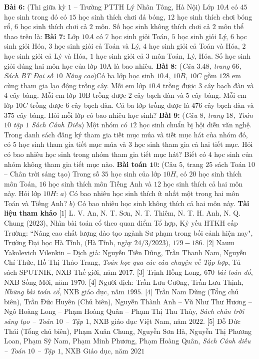 \begin{multicols}{2}
	\textbf{\color{toancuabi}Bài $\pmb6$:} (Thi giữa kỳ $1$ -- Trường PTTH Lý Nhân Tông, Hà Nội) Lớp $10A$ có $45$ học sinh trong đó có $15$ học sinh thích chơi đá bóng, $12$ học sinh thích chơi bóng rổ, $6$ học sinh thích chơi cả $2$ môn. Số học sinh không thích chơi cả $2$ môn thể thao trên là:
	\vskip 0.1cm
	\textbf{\color{toancuabi}Bài $\pmb7$:} Lớp $10A$ có $7$ học sinh giỏi Toán, $5$ học sinh giỏi Lý, $6$ học sinh giỏi Hóa, $3$ học sinh giỏi cả Toán và Lý, $4$ học sinh giỏi cả Toán và Hóa, $2$ học sinh giỏi cả Lý và Hóa, $1$ học sinh giỏi cả $3$ môn Toán, Lý, Hóa. Số học sinh giỏi đúng hai môn học của lớp 10A là bao nhiêu.
	\vskip 0.1cm
	\textbf{\color{toancuabi}Bài $\pmb8$:} (\textit{Câu $3.48$, trang $66$, Sách BT Đại số $10$ Nâng cao})Có ba lớp học sinh $10A$, $10B$, $10C$ gồm $128$ em cùng tham gia lạo động trồng cây. Mỗi em lớp $10A$ trồng được $3$ cây bạch đàn và $4$ cây bàng. Mỗi em lớp 10B trồng được $2$ cây bạch đàn và $5$ cây bàng. Mỗi em lớp $10C$ trồng được $6$ cây bạch đàn. Cả ba lớp trồng được là $476$ cây bạch đàn và $375$ cây bàng. Hỏi mỗi lớp có bao nhiêu học sinh?
	\vskip 0.1cm
	\textbf{\color{toancuabi}Bài $\pmb9$:} (\textit{Câu $8$, trang $18$, Toán $10$ tập $1$ Sách Cánh Diều}) Một nhóm có $12$ học sinh chuẩn bị hội diễn văn nghệ. Trong danh sách đăng ký tham gia tiết mục múa và tiết mục hát của nhóm đó, có $5$ học sinh tham gia tiết mục múa và $3$ học sinh tham gia cả hai tiết mục. Hỏi có bao nhiêu học sinh trong nhóm tham gia tiết mục hát? Biết có $4$ học sinh của nhóm không tham gia tiết mục nào.
	\vskip 0.1cm
	\textbf{\color{toancuabi}Bài toán $\pmb10$:} (Câu $5$, trang $25$ sách Toán $10$ -- Chân trời sáng tạo) Trong số $35$ học sinh của lớp $10H$, có $20$ học sinh thích môn Toán, $16$ học sinh thích môn Tiếng Anh và $12$ học sinh thích cả hai môn này. Hỏi lớp $10H$:
	\vskip 0.1cm
	$a)$ Có bao nhiêu học sinh thích ít nhất một trong hai môn Toán và Tiếng Anh?
	\vskip 0.1cm
	$b)$ Có bao nhiêu học sinh không thích cả hai môn này.
	\vskip 0.1cm
	\textbf{\color{toancuabi}Tài liệu tham khảo}
	\vskip 0.1cm
	[$1$]	L. V. An, N. T. Sơn, N. T. Thiêm, N. T. H. Anh, N. Q. Chung ($2023$), Nhìn bài toán cổ theo quan điểm Tổ hợp, Kỷ yếu HTKH cấp Trường: ``Nâng cao chất lượng đào tạo ngành Sư phạm trong bối cảnh hiện nay", Trường Đại học Hà Tĩnh, (Hà Tĩnh, ngày $24/3/2023$), $179 - 186$.
	\vskip 0.1cm
	[$2$] Naum Yakolevich Vilenkin -- Dịch giả: Nguyễn Tiến Dũng, Trần Thanh Nam, Nguyễn Chí Thức, Hồ Thị Thảo Trang, \textit{Toán học qua các câu chuyện về Tập hợp}, Tủ sách SPUTNIK, NXB Thế giới, năm $2017$.
	\vskip 0.1cm
	[$3$] Trịnh Hồng Long, \textit{$670$ bài toán đố}, NXB Sống Mới, năm $1970$.
	\vskip 0.1cm
	[$4$] Người dịch: Trần Lưu Cường, Trần Lưu Thịnh, \textit{Những bài toán cổ}, NXB giáo dục, năm $1995$.
	\vskip 0.1cm
	[$4$] Trần Nam Dũng (Tổng chủ biên), Trần Đức Huyên (Chủ biên), Nguyễn Thành Anh -- Vũ Như Thư Hương -- Ngô Hoàng Long -- Phạm Hoàng Quân -- Phạm Thị Thu Thủy, \textit{Sách chân trời sáng tạo -- Toán $10$ -- Tập $1$}, NXB giáo dục Việt Nam, năm $2022$.
	\vskip 0.1cm
	[$5$]	Đỗ Đức Thái (Tổng chủ biên), Phạm Xuân Chung, Nguyễn Sơn Hà, Nguyễn Thị Phương Loan, Phạm Sỹ Nam, Phạm Minh Phương, Phạm Hoàng Quân, \textit{Sách Cánh diều -- Toán $10$ -- Tập $1$}, NXB Giáo dục, năm $2021$	
\end{multicols}
